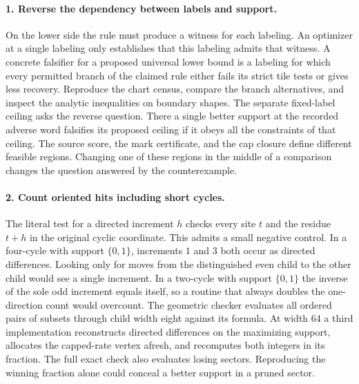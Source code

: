 \documentclass[12pt,letterpaper]{article}
\begin{document}
\paragraph{1. Reverse the dependency between labels and support.}
On the lower side the rule must produce a witness for each labeling. An optimizer at a single labeling only establishes that this labeling admits that witness. A concrete falsifier for a proposed universal lower bound is a labeling for which every permitted branch of the claimed rule either fails its strict tile tests or gives less recovery. Reproduce the chart census, compare the branch alternatives, and inspect the analytic inequalities on boundary shapes. The separate fixed-label ceiling asks the reverse question. There a single better support at the recorded adverse word falsifies its proposed ceiling if it obeys all the constraints of that ceiling. The source score, the mark certificate, and the cap closure define different feasible regions. Changing one of these regions in the middle of a comparison changes the question answered by the counterexample.

\paragraph{2. Count oriented hits including short cycles.}
The literal test for a directed increment \(h\) checks every site \(t\) and the residue \(t+h\) in the original cyclic coordinate. This admits a small negative control. In a four-cycle with support \(\{0,1\}\), increments \(1\) and \(3\) both occur as directed differences. Looking only for moves from the distinguished even child to the other child would see a single increment. In a two-cycle with support \(\{0,1\}\) the inverse of the sole odd increment equals itself, so a routine that always doubles the one-direction count would overcount. The geometric checker evaluates all ordered pairs of subsets through child width eight against its formula. At width 64 a third implementation reconstructs directed differences on the maximizing support, allocates the capped-rate vertex afresh, and recomputes both integers in its fraction. The full exact check also evaluates losing sectors. Reproducing the winning fraction alone could conceal a better support in a pruned sector.
\end{document}
